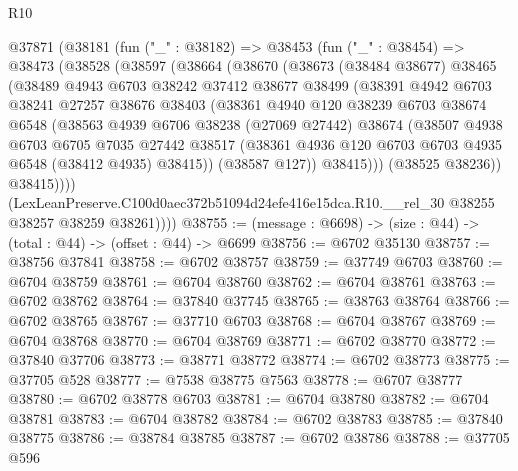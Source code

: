 \begin{lexlean}{R10}
\begin{coremodule}
  @37871
    (@38181
      (fun ("_" : @38182) =>
      @38453
        (fun ("_" : @38454) =>
        @38473
          (@38528
            (@38597
              (@38664
                (@38670
                  (@38673
                    (@38484 @38677)
                    @38465
                    (@38489
                      @4943
                      @6703
                      @38242
                      @37412
                      @38677
                      @38499
                      (@38391
                        @4942
                        @6703
                        @38241
                        @27257
                        @38676
                        @38403
                        (@38361
                          @4940
                          @120
                          @38239
                          @6703
                          @38674
                          @6548
                          (@38563
                            @4939
                            @6706
                            @38238
                            (@27069 @27442)
                            @38674
                            (@38507
                              @4938
                              @6703
                              @6705
                              @7035
                              @27442
                              @38517
                              (@38361 @4936 @120 @6703 @6703 @4935 @6548 (@38412 @4935) @38415))
                            (@38587 @127))
                          @38415)))
                    (@38525 @38236))
                  @38415))))
          (LexLeanPreserve.C100d0aec372b51094d24efe416e15dca.R10.__rel_30
            @38255
            @38257
            @38259
            @38261))))
@38755 := (message : @6698) -> (size : @44) -> (total : @44) -> (offset : @44) -> @6699
@38756 := @6702 @35130
@38757 := @38756 @37841
@38758 := @6702 @38757
@38759 := @37749 @6703
@38760 := @6704 @38759
@38761 := @6704 @38760
@38762 := @6704 @38761
@38763 := @6702 @38762
@38764 := @37840 @37745
@38765 := @38763 @38764
@38766 := @6702 @38765
@38767 := @37710 @6703
@38768 := @6704 @38767
@38769 := @6704 @38768
@38770 := @6704 @38769
@38771 := @6702 @38770
@38772 := @37840 @37706
@38773 := @38771 @38772
@38774 := @6702 @38773
@38775 := @37705 @528
@38777 := @7538 @38775 @7563
@38778 := @6707 @38777
@38780 := @6702 @38778 @6703
@38781 := @6704 @38780
@38782 := @6704 @38781
@38783 := @6704 @38782
@38784 := @6702 @38783
@38785 := @37840 @38775
@38786 := @38784 @38785
@38787 := @6702 @38786
@38788 := @37705 @596

\end{coremodule}
\end{lexlean}
